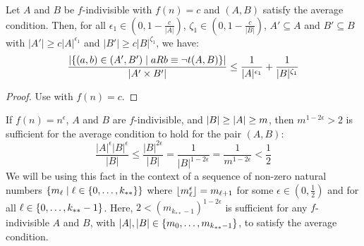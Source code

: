     \begin{corollary}[Corollary 4.9]
        Let $A$ and $B$ be $f$-indivisible with $f(n) = c$ and $(A,B)$ satisfy the average condition.
        Then, for all $\epsilon_1 \in (0, 1 - \frac{c}{|A|})$, $\zeta_1 \in (0, 1 - \frac{c}{|B|})$, $A' \subseteq A$ and
            $B' \subseteq B$ with $|A'| \geq c |A|^{\epsilon_1}$ and $|B'| \geq c |B|^{\zeta_1}$, we have:
        \[
            \frac{|\{ (a,b) \in (A',B') \mid a R b \equiv \neg t(A,B) \}|}{|A' \times B'|} \leq
                \frac{1}{|A|^{\epsilon_1}} + \frac{1}{|B|^{\zeta_1}}
        \]
        \begin{proof}
            Use  with $f(n) = c$.
        \end{proof}
    \end{corollary}

    \begin{remark}\label{rmk:sufficient_requirement_for_average_condition}
        If $f(n) = n^\epsilon$, $A$ and $B$ are $f$-indivisible, and $| B | \geq | A | \geq m$,
        then $m^{1-2\epsilon} > 2$ is sufficient for the average condition to hold for the pair $(A,B)$:
        \[
            \frac{|A|^\epsilon |B|^\epsilon}{|B|}
                \leq \frac{|B|^{2\epsilon}}{|B|}
                = \frac{1}{|B|^{1-2\epsilon}}
                = \frac{1}{m^{1-2\epsilon}}
                < \frac{1}{2}
        \]
        We will be using this fact in the context of a sequence of non-zero natural numbers
        $\{ m_\ell \mid \ell \in \{ 0, \dots, k_{**} \} \}$ where $\left\lfloor m_\ell^\epsilon \right\rfloor = m_{\ell+1}$
        for some $\epsilon \in (0, \frac{1}{2})$ and for all $\ell \in \{ 0, \dots, k_{**}-1 \}$.
        Here, $2 < (m_{k_{**}-1})^{1-2\epsilon}$ is sufficient for any $f$-indivisible $A$ and $B$, with
        $|A|, |B| \in \{ m_0, \dots, m_{k_{**}-1} \}$, to satisfy the average condition.
    \end{remark}

